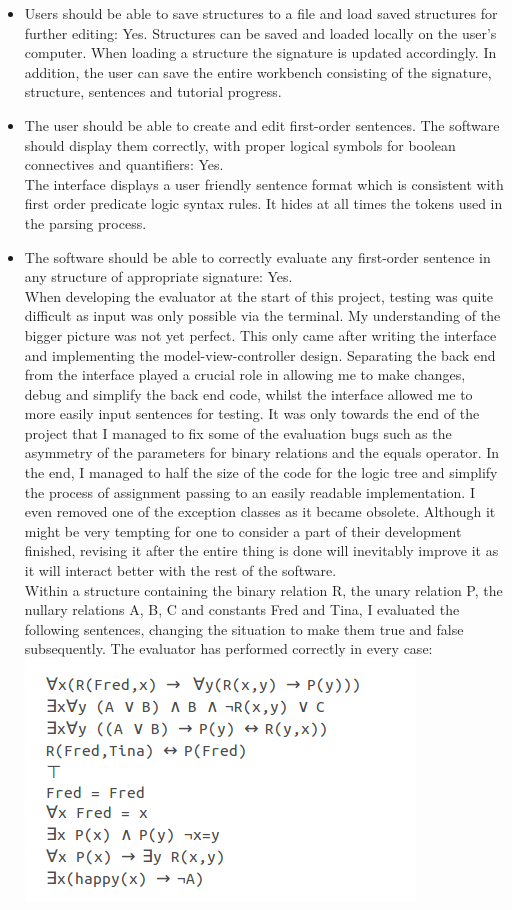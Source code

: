 \documentclass{report}
\begin{document}
\begin{itemize}
\item Users should be able to save structures to a file and load saved 
structures for further editing: Yes. Structures can be saved and loaded locally 
on the user's computer. When loading a structure the signature is updated 
accordingly. In addition, the user can save the entire workbench consisting of 
the signature, structure, sentences and tutorial progress. 

\item The user should be able to create and edit first-order sentences. The 
software should display them correctly, with proper logical symbols for boolean 
connectives and quantifiers: Yes.\\
The interface displays a user friendly sentence format which is consistent with 
first order predicate logic syntax rules. It hides at all times the tokens used 
in the parsing process. 

\item The software should be able to correctly evaluate any first-order sentence 
in any structure of appropriate signature: Yes.\\
When developing the evaluator at the start of this project, testing was quite 
difficult as input was only possible via the terminal. My understanding of the 
bigger picture was not yet perfect. This only came after writing the interface 
and implementing the model-view-controller design. Separating the back end from 
the interface played a crucial role in allowing me to make changes, debug and 
simplify the back end code, whilst the interface allowed me to more easily input 
sentences for testing. It was only towards the end of the project that I managed 
to fix some of the evaluation bugs such as the asymmetry of the parameters for 
binary relations and the equals operator. In the end, I managed to half the size 
of the code for the logic tree and simplify the process of assignment passing to 
an easily readable implementation. I even removed one of the exception classes 
as it became obsolete. Although it might be very tempting for one to consider a 
part of their development finished, revising it after the entire thing is done 
will inevitably improve it as it will interact better with the rest of the 
software.\\
Within a structure containing the binary relation R, the unary relation P, the 
nullary relations A, B, C and constants Fred and Tina, I evaluated the following 
sentences, changing the situation to make them true and false subsequently. The 
evaluator has performed correctly in every case:
\includegraphics[scale=0.5]{testing.png}


\end{itemize}
\end{document}
